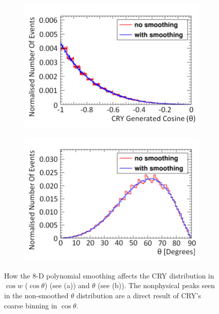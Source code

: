 \begin{figure}[!h]
\centering
\begin{subfigure}{.5\textwidth}
  \centering
  \includegraphics[width=\linewidth]{Chapter4/Figs/Raster/CryPlots/CrySmoothingCosineMedText.png}
  \captionsetup{width=.9\linewidth}
  \caption{}
  \label{subFig:CrySmoothingCosine}
\end{subfigure}%
\begin{subfigure}{.5\textwidth}
  \centering
  \includegraphics[width=\linewidth]{Chapter4/Figs/Raster/CryPlots/CrySmoothingThetaMedText.png}
  \captionsetup{width=.9\linewidth}
  \caption{}
  \label{subFig:CrySmoothingTheta}
\end{subfigure}
\caption{How the 8-D polynomial smoothing affects the CRY distribution in $\cos{w}$ ($\cos{\theta}$) (see (a)) and $\theta$ (see (b)). The nonphysical peaks seen in the non-smoothed $\theta$ distribution are a direct result of CRY's coarse binning in $\cos{\theta}$.}
\label{fig:CrySmoothingCosTheta}
\end{figure}

